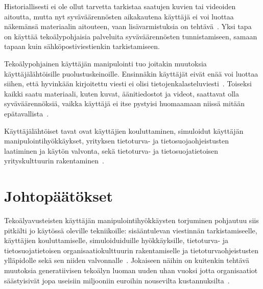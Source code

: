 \begin{otherlanguage}{finnish}
Historiallisesti ei ole ollut tarvetta tarkistaa saatujen kuvien tai videoiden aitoutta, mutta nyt syväväärennösten aikakautena käyttäjä ei voi luottaa näkemänsä materiaalin aitouteen, vaan lisävarmistuksia on tehtävä~\citep{mirsky_Creation_Detection_Deepfakes_2021}. Yksi tapa on käyttää tekoälypohjaisia palveluita syväväärennösten tunnistamiseen, samaan tapaan kuin sähköpostiviestienkin tarkistamiseen.


Tekoälypohjainen käyttäjän manipulointi tuo joitakin muutoksia käyttäjälähtöisille puolustuskeinoille. Ensinnäkin käyttäjät eivät enää voi luottaa siihen, että hyvinkään kirjoitettu viesti ei olisi tietojenkalasteluviesti~\citep{gupta_From_ChatGPT_to_ThreatGPT_2023}. Toiseksi kaikki saatu materiaali, kuten kuvat, äänitiedostot ja videot, saattavat olla syväväärennöksiä, vaikka käyttäjä ei itse pystyisi huomaamaan niissä mitään epätavallista~\citep{blauth_AI_Crime_Overview_Malicious_Use_Abuse_2022}.



Käyttäjälähtöiset tavat ovat käyttäjien kouluttaminen, simuloidut käyttäjän manipulointihyökkäykset, yrityksen tietoturva- ja tietosuojaohjeistusten laatiminen ja käytön valvonta, sekä tietoturva- ja tietosuojatietoisen yrityskulttuurin rakentaminen~\citep{tsinganos_Towards_Automated_Recognition_Chat_SE_Enterprise_2018}.




\section*{Johtopäätökset}

Tekoälyavusteisten käyttäjän manipulointihyökkäysten torjuminen pohjautuu siis pitkälti jo käytössä oleville tekniikoille: sisääntulevan viestinnän tarkistamiseelle, käyttäjien kouluttamiselle, simuloiduiduille hyökkäyksille, tietoturva- ja tietosuojatietoisen organisaatiokulttuurin rakentamiselle ja tietoturvaohjeistusten ylläpidolle sekä sen niiden valvonnalle~\citep{fakhouri_AI_Driven_Solutions_SE_Attacks_2024}. Jokaiseen näihin on kuitenkin tehtävä muutoksia generatiivisen tekoälyn luoman uuden uhan vuoksi jotta organisaatiot säästyisivät jopa useisiin miljooniin euroihin nousevilta kustannuksilta~\citep{eniza_Threat_Landscape_2024, verizon_Data_Breach_Investigations_Report_2024}.


\end{otherlanguage}
